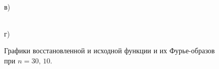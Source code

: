 \documentclass[a5paper, 10pt]{article}
\theoremstyle{definition}
\theoremstyle{plain}
\theoremstyle{remark}
\begin{document}
\begin{figure}[h!]
\begin{minipage}[h!]{0.5\linewidth}
 \\в)
\end{minipage}
\hfill
\begin{minipage}[h!]{0.5\linewidth}
 \\г)
\end{minipage}
\caption{ Графики восстановленной и исходной функции и их Фурье-образов при $n=30, \, 10$.}
\end{figure}
\end{document}
